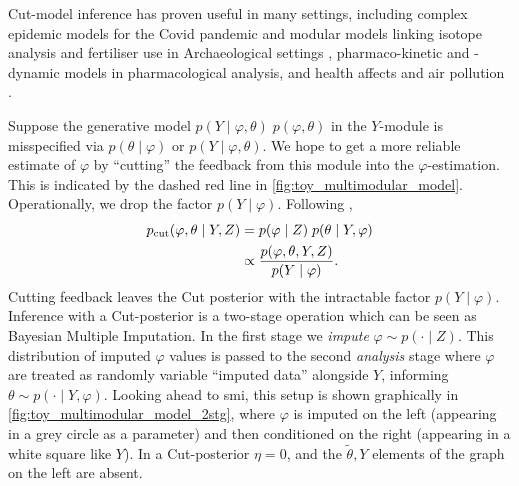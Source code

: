 Cut-model inference has proven useful in many settings, including complex epidemic models for the Covid pandemic \citep{Teh2021covid,Nicholson2021covid} and modular models linking isotope analysis and fertiliser use in Archaeological settings \citep{Styring2017extensification}, pharmaco-kinetic and -dynamic models \citep{Lunn2009pkpd} in pharmacological analysis, and health affects and air pollution \citep{Blangiardo11}.

Suppose the generative model $p(Y\mid \varphi,\theta)\; p(\varphi,\theta)$ in the $Y$-module is misspecified via $p(\theta\mid \varphi)$ or $p(Y\mid \varphi,\theta)$.
%
We hope to get a more reliable estimate of $\varphi$ by ``cutting'' the feedback from this module into the $\varphi$-estimation.
%
This is indicated by the dashed red line in \cref{fig:toy_multimodular_model}. Operationally, we drop the factor $p(Y\mid \varphi)$. Following \cite{Plummer2015cut},
\begin{align} \label{eq:cut_posterior}
  p_{\operatorname{\text{cut}}}(\varphi,\theta \mid Y,Z) & = p(\varphi \mid Z) \; p(\theta \mid Y,\varphi)
  \\ &
  \propto \frac{p(\varphi, \theta, Y, Z)}{p(Y \mid \varphi) }.  \nonumber
\end{align}
Cutting feedback leaves the Cut posterior with the intractable factor $p(Y \mid \varphi)$.
Inference with a Cut-posterior is a two-stage operation which can be seen as Bayesian Multiple Imputation. In the first stage we \emph{impute} $\varphi\sim p(\cdot \mid Z)$. This distribution of imputed $\varphi$ values is passed to the second \emph{analysis} stage where $\varphi$ are treated as randomly variable ``imputed data'' alongside $Y$, informing $\theta\sim p(\cdot \mid Y, \varphi)$. Looking ahead to \acrshort*{smi}, this setup is shown graphically in \cref{fig:toy_multimodular_model_2stg}, where $\varphi$ is imputed on the left (appearing in a grey circle as a parameter) and then conditioned on the right (appearing in a white square like $Y$). In a Cut-posterior $\eta=0$, and the $\tilde\theta,Y$ elements of the graph on the left are absent.


